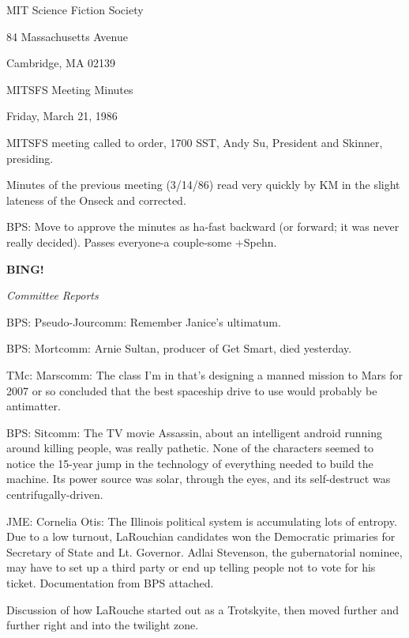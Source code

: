 \documentclass[12pt]{article}
\newcommand{\bing}{{\bf BING!} }
\newcommand{\goto}[1]{\bing \vskip 12pt \centerline{{\em{#1}}}}
\begin{document}
\begin{center}

MIT Science Fiction Society 

84 Massachusetts Avenue

Cambridge, MA 02139

\vspace{12pt}

MITSFS Meeting Minutes 

Friday, March 21, 1986

\end{center}
 
\vspace{18pt}

\setlength{\parskip}{6pt}

\noindent
MITSFS meeting called to order, 1700 SST,
Andy Su, President and Skinner, presiding.

Minutes of the previous meeting (3/14/86) read very quickly by KM in the slight lateness of the Onseck and corrected.

BPS: Move to approve the minutes as ha-fast backward (or forward; it was never really decided). Passes everyone-a couple-some +Spehn.

\goto{Committee Reports}

BPS: Pseudo-Jourcomm: Remember Janice's ultimatum.

BPS: Mortcomm: Arnie Sultan, producer of Get Smart, died yesterday.

TMc: Marscomm: The class I'm in that's designing a manned mission to Mars for 2007 or so concluded that the best spaceship drive to use would probably be antimatter.

BPS: Sitcomm: The TV movie Assassin, about an intelligent android running around killing people, was really pathetic. None of the characters seemed to notice the 15-year jump in the technology of everything needed to build the machine. Its power source was solar, through the eyes, and its self-destruct was centrifugally-driven.

JME: Cornelia Otis: The Illinois political system is accumulating lots of entropy. Due to a low turnout, LaRouchian candidates won the Democratic primaries for Secretary of State and Lt. Governor. Adlai Stevenson, the gubernatorial nominee, may have to set up a third party or end up telling people not to vote for his ticket. Documentation from BPS attached.

Discussion of how LaRouche started out as a Trotskyite, then moved further and further right and into the twilight zone.
\end{document}
